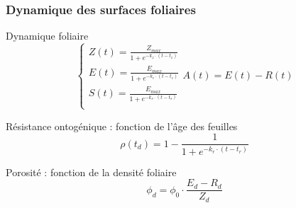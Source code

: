 \documentclass[10pt]{beamer}
\begin{document}
\begin{frame}
\frametitle{Dynamique des surfaces foliaires}

\begin{block}{Dynamique foliaire}	
	\begin{equation*}
	\begin{cases}
	Z(t) = \frac{Z_{max}}{1 + e^{-k_z \cdot (t-t_z)}}\\
	E(t) = \frac{E_{max}}{1 + e^{-k_e \cdot (t-t_e)}}\\
	S(t) = \frac{E_{max}}{1 + e^{-k_s \cdot (t-t_s)}}\\
	\end{cases}
	\displaystyle A(t) = E(t) - R(t)
	\end{equation*}
\end{block}

\begin{block}{Résistance ontogénique : fonction de l'âge des feuilles}	
	\begin{equation*}
	\rho(t_d) = 1 - \frac{1}{1 + e^{-k_r \cdot (t-t_r)}}
	\end{equation*}
\end{block}

\begin{block}{Porosité : fonction de la densité foliaire}	
	\begin{equation*}
	\phi_d = \phi_0 \cdot \frac{E_d - R_d}{Z_d}
	\end{equation*}
\end{block}

\end{frame}
\end{document}
